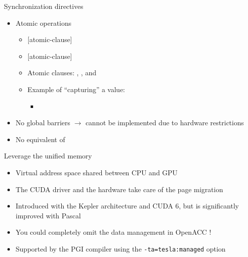 \documentclass[12pt,aspectratio=169]{beamer}
\newcommand\shinline[2][]{\lstinline[style=shstyle,basicstyle=\ttfamily,#1]!#2!}
\begin{document}
\begin{frame}[fragile]{Synchronization directives}
  \begin{itemize}
  \item Atomic operations
    \begin{itemize}
    \item {} [atomic-clause]
    \item {} [atomic-clause]
    \item Atomic clauses: , ,
       and 
    \item Example of ``capturing'' a value:
      \begin{itemize}
      \item {}
      \end{itemize}
    \end{itemize}
  \item No global barriers $\rightarrow$ cannot be implemented due to hardware restrictions
  \item No equivalent of 
  \end{itemize}
\end{frame}

\begin{frame}[fragile]{Leverage the unified memory}
  \begin{itemize}
  \item Virtual address space shared between CPU and GPU
  \item The CUDA driver and the hardware take care of the page migration
  \item Introduced with the Kepler architecture and CUDA 6, but is significantly improved with Pascal
    \pause\vfill
  \item You could completely omit the data management in OpenACC !
  \item Supported by the PGI compiler using the \shinline{-ta=tesla:managed} option
  \end{itemize}
\end{frame}
\end{document}
